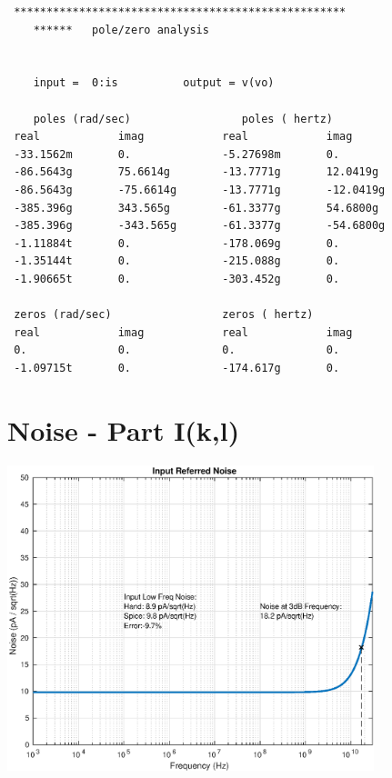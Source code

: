 \documentclass[12pt,a4paper]{article}
\begin{document}
\begin{verbatim}
 ***************************************************
    ******   pole/zero analysis


    input =  0:is          output = v(vo)

    poles (rad/sec)                 poles ( hertz)
 real            imag            real            imag            
 -33.1562m       0.              -5.27698m       0.              
 -86.5643g       75.6614g        -13.7771g       12.0419g        
 -86.5643g       -75.6614g       -13.7771g       -12.0419g       
 -385.396g       343.565g        -61.3377g       54.6800g        
 -385.396g       -343.565g       -61.3377g       -54.6800g       
 -1.11884t       0.              -178.069g       0.              
 -1.35144t       0.              -215.088g       0.              
 -1.90665t       0.              -303.452g       0.              

 zeros (rad/sec)                 zeros ( hertz)
 real            imag            real            imag            
 0.              0.              0.              0.              
 -1.09715t       0.              -174.617g       0.

\end{verbatim}

\pagebreak



\section{Noise - Part I(k,l)}

{\centering
	\includegraphics[width=0.8\textwidth]{plots/part_l.eps}
\par}
\end{document}
